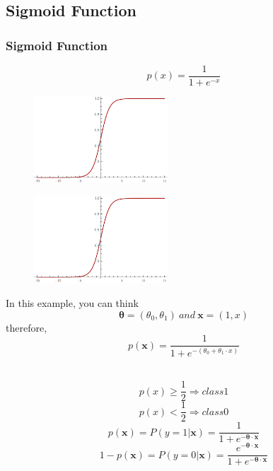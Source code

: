 \documentclass{beamer}
\begin{document}
\subsection{Sigmoid Function}
\begin{frame}
\frametitle{Sigmoid Function}
\[p(x)=\frac{1}{1+e^{-x}}\]
\begin{figure}[t]
\includegraphics[width=5cm]{graphics/1d-sigmoid}
\centering
\end{figure}
\end{frame}
\begin{frame}
\begin{multicols}{2} %
\begin{figure}[t]
\includegraphics[width=5cm]{graphics/1d-sigmoid}
\centering
\end{figure}
\columnbreak  %
In this example, you can think 
\[ \bm{\theta} = (\theta_{0}, \theta_{1}) \ and \ \mathbf{x} = (1, x)\]
therefore, 
\[p(\mathbf{x}) =  \frac{1}{1+e^{- ( \theta_{0} +  \theta_{1} \cdot  x )}} \]
\\
\end{multicols}

\begin{multicols}{2}
\[p(x) \geq \frac{1}{2}  \Rightarrow class 1\]
\[p(x)<\frac{1}{2}  \Rightarrow class 0\]
\columnbreak 
\[p(\mathbf{x})=P(y=1|\mathbf{x}) = \frac{1}{1+e^{-\bm{\theta} \cdot\mathbf{x}}}\]
\[1-p(\mathbf{x})=P(y=0|\mathbf{x}) = \frac{e^{-\bm{\theta} \cdot \mathbf{x}}} {1+e^{-\bm{\theta}\cdot \mathbf{x}}} \]
\end{multicols}

\end{frame}
\end{document}
